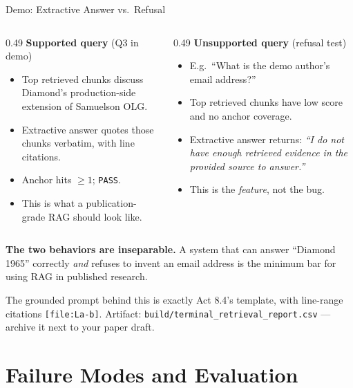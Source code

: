 \begin{frame}{Demo: Extractive Answer vs.\ Refusal}
\begin{columns}[T]
\begin{column}{0.49\textwidth}
\textbf{Supported query} (Q3 in demo)
\begin{itemize}\small
\item Top retrieved chunks discuss Diamond's production-side extension of Samuelson OLG.
\item Extractive answer quotes those chunks verbatim, with line citations.
\item Anchor hits $\geq 1$; \texttt{PASS}.
\item This is what a publication-grade RAG should look like.
\end{itemize}
\end{column}
\begin{column}{0.49\textwidth}
\textbf{Unsupported query} (refusal test)
\begin{itemize}\small
\item E.g.\ ``What is the demo author's email address?''
\item Top retrieved chunks have low score and no anchor coverage.
\item Extractive answer returns: \emph{``I do not have enough retrieved evidence in the provided source to answer.''}
\item This is the \emph{feature}, not the bug.
\end{itemize}
\end{column}
\end{columns}

\vspace{0.15cm}
\begin{takeawaybox}
\textbf{The two behaviors are inseparable.} A system that can answer ``Diamond 1965'' correctly \emph{and} refuses to invent an email address is the minimum bar for using RAG in published research.
\end{takeawaybox}

\vspace{0.08cm}
{\footnotesize The grounded prompt behind this is exactly Act 8.4's template, with line-range citations \texttt{[file:La-b]}. Artifact: \texttt{build/terminal\_retrieval\_report.csv} --- archive it next to your paper draft.}
\end{frame}

\section{Failure Modes and Evaluation}


